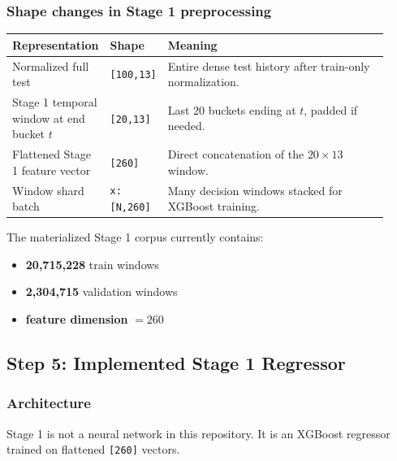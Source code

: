 \documentclass[11pt]{article}
\newcommand{\toprule}{\hline}
\newcommand{\midrule}{\hline}
\newcommand{\bottomrule}{\hline}
\begin{document}
\subsubsection*{Shape changes in Stage 1 preprocessing}

\begin{center}
\begin{tabular}{M{0.23\linewidth} M{0.09\linewidth} M{0.60\linewidth}}
\toprule
\textbf{Representation} & \textbf{Shape} & \textbf{Meaning} \\
\midrule
Normalized full test & \texttt{[100,13]} & Entire dense test history after train-only normalization. \\
Stage 1 temporal window at end bucket \(t\) & \texttt{[20,13]} & Last 20 buckets ending at \(t\), padded if needed. \\
Flattened Stage 1 feature vector & \texttt{[260]} & Direct concatenation of the \(20 \times 13\) window. \\
Window shard batch & \texttt{x:[N,260]} & Many decision windows stacked for XGBoost training. \\
\bottomrule
\end{tabular}
\end{center}

The materialized Stage 1 corpus currently contains:
\begin{itemize}
\item \textbf{20,715,228} train windows
\item \textbf{2,304,715} validation windows
\item \textbf{feature dimension} \(= 260\)
\end{itemize}

\subsection{Step 5: Implemented Stage 1 Regressor}

\subsubsection*{Architecture}

Stage 1 is not a neural network in this repository. It is an XGBoost regressor trained on flattened \texttt{[260]} vectors.
\end{document}
